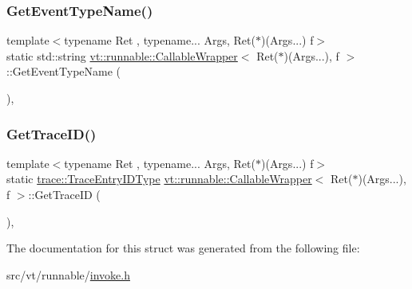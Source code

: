 \subsubsection{\texorpdfstring{Get\+Event\+Type\+Name()}{GetEventTypeName()}}
{\footnotesize\ttfamily template$<$typename Ret , typename... Args, Ret($\ast$)(\+Args...) f$>$ \\
static std\+::string \hyperlink{structvt_1_1runnable_1_1_callable_wrapper}{vt\+::runnable\+::\+Callable\+Wrapper}$<$ Ret($\ast$)(Args...), f $>$\+::Get\+Event\+Type\+Name (\begin{DoxyParamCaption}{ }\end{DoxyParamCaption})\hspace{0.3cm}{\ttfamily [inline]}, {\ttfamily [static]}}

\mbox{\label{structvt_1_1runnable_1_1_callable_wrapper_3_01_ret_07_5_08_07_args_8_8_8_08_00_01f_01_4_abb931e8a586cb613b27359d8993bb623}} 
\subsubsection{\texorpdfstring{Get\+Trace\+I\+D()}{GetTraceID()}}
{\footnotesize\ttfamily template$<$typename Ret , typename... Args, Ret($\ast$)(\+Args...) f$>$ \\
static \hyperlink{namespacevt_1_1trace_a3c14050715ba9eceaeff51fb3de64f2f}{trace\+::\+Trace\+Entry\+I\+D\+Type} \hyperlink{structvt_1_1runnable_1_1_callable_wrapper}{vt\+::runnable\+::\+Callable\+Wrapper}$<$ Ret($\ast$)(Args...), f $>$\+::Get\+Trace\+ID (\begin{DoxyParamCaption}{ }\end{DoxyParamCaption})\hspace{0.3cm}{\ttfamily [inline]}, {\ttfamily [static]}}



The documentation for this struct was generated from the following file\+:\begin{DoxyCompactItemize}
\item 
src/vt/runnable/\hyperlink{invoke_8h}{invoke.\+h}\end{DoxyCompactItemize}
